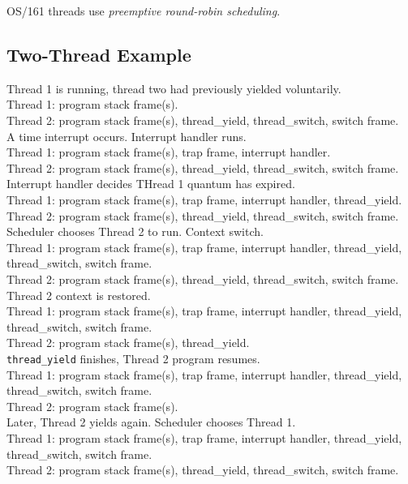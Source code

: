 \documentclass[12pt]{article}
\theoremstyle{plain}
\theoremstyle{definition}
\begin{document}
OS/161 threads use \emph{preemptive round-robin scheduling}.

\subsection{Two-Thread Example}
Thread 1 is running, thread two had previously yielded voluntarily. \\
Thread 1: program stack frame(s). \\
Thread 2: program stack frame(s), thread\_yield, thread\_switch, switch frame. \\

A time interrupt occurs. Interrupt handler runs. \\
Thread 1: program stack frame(s), trap frame, interrupt handler. \\
Thread 2: program stack frame(s), thread\_yield, thread\_switch, switch frame. \\

Interrupt handler decides THread 1 quantum has expired. \\
Thread 1: program stack frame(s), trap frame, interrupt handler, thread\_yield. \\
Thread 2: program stack frame(s), thread\_yield, thread\_switch, switch frame. \\

Scheduler chooses Thread 2 to run. Context switch. \\
Thread 1: program stack frame(s), trap frame, interrupt handler, thread\_yield, thread\_switch, switch frame. \\
Thread 2: program stack frame(s), thread\_yield, thread\_switch, switch frame. \\

Thread 2 context is restored. \\
Thread 1: program stack frame(s), trap frame, interrupt handler, thread\_yield, thread\_switch, switch frame. \\
Thread 2: program stack frame(s), thread\_yield. \\

\texttt{thread\_yield} finishes, Thread 2 program resumes. \\
Thread 1: program stack frame(s), trap frame, interrupt handler, thread\_yield, thread\_switch, switch frame. \\
Thread 2: program stack frame(s). \\

Later, Thread 2 yields again. Scheduler chooses Thread 1. \\
Thread 1: program stack frame(s), trap frame, interrupt handler, thread\_yield, thread\_switch, switch frame. \\
Thread 2: program stack frame(s), thread\_yield, thread\_switch, switch frame. \\
\end{document}
